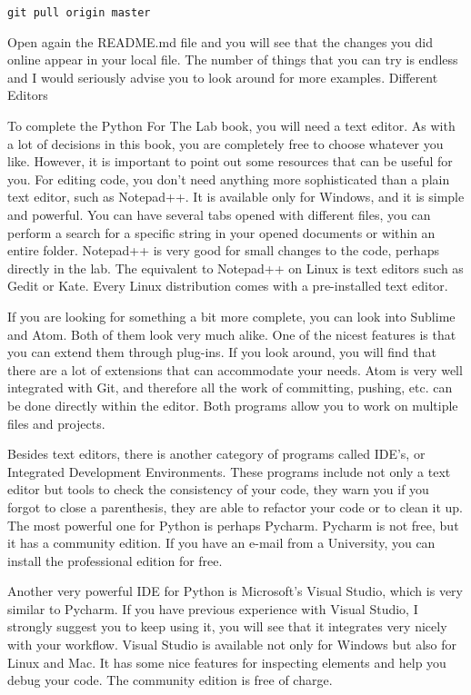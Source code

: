 \begin{verbatim}
git pull origin master
\end{verbatim}

Open again the README.md file and you will see that the changes you did online appear in your local file. The number of things that you can try is endless and I would seriously advise you to look around for more examples.
Different Editors

To complete the Python For The Lab book, you will need a text editor. As with a lot of decisions in this book, you are completely free to choose whatever you like. However, it is important to point out some resources that can be useful for you. For editing code, you don’t need anything more sophisticated than a plain text editor, such as Notepad++. It is available only for Windows, and it is simple and powerful. You can have several tabs opened with different files, you can perform a search for a specific string in your opened documents or within an entire folder. Notepad++ is very good for small changes to the code, perhaps directly in the lab. The equivalent to Notepad++ on Linux is text editors such as Gedit or Kate. Every Linux distribution comes with a pre-installed text editor.

If you are looking for something a bit more complete, you can look into Sublime and Atom. Both of them look very much alike. One of the nicest features is that you can extend them through plug-ins. If you look around, you will find that there are a lot of extensions that can accommodate your needs. Atom is very well integrated with Git, and therefore all the work of committing, pushing, etc. can be done directly within the editor. Both programs allow you to work on multiple files and projects.

Besides text editors, there is another category of programs called IDE’s, or Integrated Development Environments. These programs include not only a text editor but tools to check the consistency of your code, they warn you if you forgot to close a parenthesis, they are able to refactor your code or to clean it up. The most powerful one for Python is perhaps Pycharm. Pycharm is not free, but it has a community edition. If you have an e-mail from a University, you can install the professional edition for free.

Another very powerful IDE for Python is Microsoft’s Visual Studio, which is very similar to Pycharm. If you have previous experience with Visual Studio, I strongly suggest you to keep using it, you will see that it integrates very nicely with your workflow. Visual Studio is available not only for Windows but also for Linux and Mac. It has some nice features for inspecting elements and help you debug your code. The community edition is free of charge.

